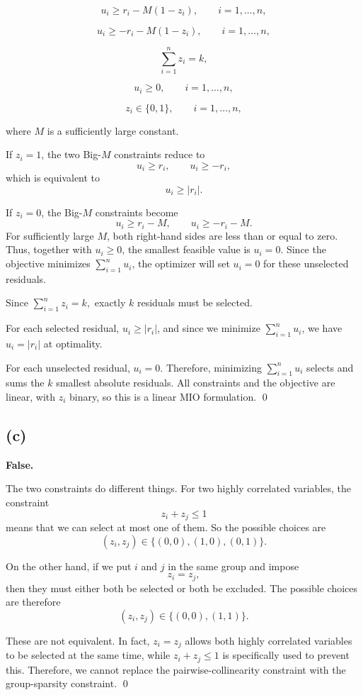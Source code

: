 \documentclass{article}
\begin{document}
\[
u_i \geq r_i - M(1-z_i),
\qquad i=1,\ldots,n,
\]

\[
u_i \geq -r_i - M(1-z_i),
\qquad i=1,\ldots,n,
\]

\[
\sum_{i=1}^n z_i = k,
\]

\[
u_i \geq 0,
\qquad i=1,\ldots,n,
\]

\[
z_i \in \{0,1\},
\qquad i=1,\ldots,n,
\]

where $M$ is a sufficiently large constant.

If $z_i=1$, the two Big-$M$ constraints reduce to
\[
u_i \geq r_i,
\qquad
u_i \geq -r_i,
\]
which is equivalent to 
\[
u_i \geq |r_i|.
\]

If $z_i=0$, the Big-$M$ constraints become
\[
u_i \geq r_i-M,
\qquad
u_i \geq -r_i-M.
\]
For sufficiently large $M$, both right-hand sides are less than or
equal to zero. Thus, together with $u_i\geq 0$, the smallest feasible
value is
$
u_i=0.$
Since the objective minimizes $\sum_{i=1}^n u_i$, the optimizer will
set $u_i=0$ for these unselected residuals.


Since
$
\sum_{i=1}^n z_i=k,
$
exactly $k$ residuals must be selected. 


For each selected residual,
$u_i \geq |r_i|$, and since we minimize $\sum_{i=1}^n u_i$, we have
$u_i=|r_i|$ at optimality. 

For each unselected residual, $u_i=0$.
Therefore, minimizing $\sum_{i=1}^n u_i$ selects and sums the $k$
smallest absolute residuals. All constraints and the objective are
linear, with $z_i$ binary, so this is a linear MIO formulation. \qed



\newpage
\subsection*{(c)}


\textbf{False.}

The two constraints do different things. For two highly correlated
variables, the constraint
\[
z_i + z_j \leq 1
\]
means that we can select at most one of them. So the possible choices
are
\[
(z_i,z_j) \in \{(0,0),(1,0),(0,1)\}.
\]

On the other hand, if we put $i$ and $j$ in the same group and impose
\[
z_i=z_j,
\]
then they must either both be selected or both be excluded. The possible
choices are therefore
\[
(z_i,z_j) \in \{(0,0),(1,1)\}.
\]

These are not equivalent. In fact, $z_i=z_j$ allows both highly
correlated variables to be selected at the same time, while
$z_i+z_j\leq1$ is specifically used to prevent this. Therefore, we
cannot replace the pairwise-collinearity constraint with the
group-sparsity constraint. \qed
\end{document}
